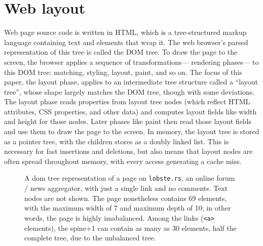 
\section{Web layout}

Web page source code is written in HTML,
  which is a tree-structured markup language
  containing text and elements that wrap it.
The web browser's parsed representation of this tree
  is called the DOM tree.
To draw the page to the screen,
  the browser applies a sequence of transformations---%
  rendering phases---%
  to this DOM tree: matching, styling, layout, paint, and so on.
The focus of this paper, the layout phase,
  applies to an intermediate tree structure
  called a ``layout tree'',
  whose shape largely matches the DOM tree,
  though with some deviations.
The layout phase reads properties from layout tree nodes
  (which reflect HTML attributes, CSS properties, and other data)
  and computes layout fields like width and height for those nodes.
Later phases like paint then read those layout fields
  and use them to draw the page to the screen.
In memory,
  the layout tree is stored as a pointer tree,
  with the children stores as a doubly linked list.
This is necessary for fast insertions and deletions,
  but also means that layout nodes are
  often spread throughout memory,
  with every access generating a cache miss.


\begin{figure}
\centering
\caption{A dom tree representation
  of a page on \texttt{lobste.rs},
  an online forum / news aggregator,
  with just a single link and no comments.
Text nodes are not shown.
The page nonetheless contains 69 elements,
  with the maximum width of 7 and maximum depth of 10;
  in other words, the page is highly imabalanced.
Among the links (\texttt{<a>} elements),
  the spine+1 can contain as many as 30 elements, half the complete tree,
  due to the unbalanced tree.}
\label{fig:dom-tree-raw}
\end{figure}

